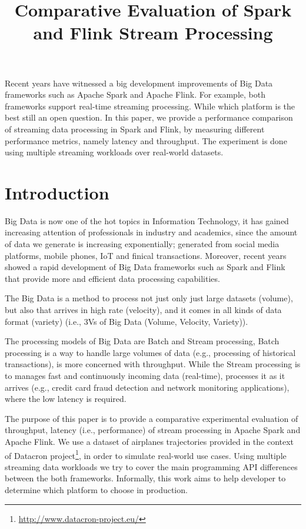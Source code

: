 \documentclass[]{article}
\title{Comparative Evaluation of Spark and Flink Stream Processing}
\begin{document}
\maketitle
\newpage
\tableofcontents

\newpage


\begin{abstract}

\end{abstract}
Recent years have witnessed a big development improvements of Big Data frameworks such as Apache Spark and Apache Flink. For example, both frameworks support real-time
streaming processing. While which platform is the best still an open question. 
In this paper, we provide a performance comparison of streaming data processing in Spark and Flink, by measuring different performance metrics, namely latency and throughput. The experiment is done using multiple streaming workloads over real-world datasets.
\section{Introduction}

\par Big Data is now one of the hot topics in Information Technology, it has gained increasing attention of professionals in industry and academics, since the amount of data we generate is increasing exponentially; generated from social media platforms, mobile phones, IoT and finical transactions. Moreover, recent years showed a rapid development of Big Data frameworks such as Spark and Flink that provide more and efficient data processing capabilities.
 \par The Big Data is a method to process not just only just large datasets (volume), but also that arrives in high rate (velocity), and it comes in all kinds of data format (variety) (i.e., 3Vs of Big Data (Volume, Velocity, Variety))\cite{svs}.

\par The processing models of Big Data are Batch and Stream processing, Batch processing is a way to handle large volumes of data (e.g., processing of historical transactions), is more concerned with throughput. While the Stream processing  is to manages fast and continuously incoming data (real-time), processes it as it arrives (e.g., credit card fraud detection and network monitoring applications), where the low latency is required.

\par The purpose of this paper is to provide a comparative experimental evaluation of throughput, latency (i.e., performance) of stream processing in Apache Spark and Apache Flink. We use a dataset of airplanes trajectories provided in the context of Datacron project\footnote{\url{http://www.datacron-project.eu/}}, in order to simulate real-world use cases. Using multiple streaming data workloads we try to cover the main programming API differences between the both frameworks. Informally,  this work aims to help developer to determine which platform to choose in production. 
\end{document}
